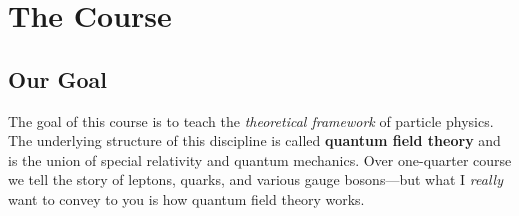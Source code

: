 \documentclass[12pt, oneside]{report}    %
\let\oldsection\section
\def\section{%
  \setcounter{sidenote}{1}%
  \oldsection
}
\begin{document}
\newpage

\small
\setcounter{tocdepth}{2}
\tableofcontents
\normalsize
\clearpage
\restoregeometry        %








% 
% 
% 
% 
% 


\chapter{The Course}

\section{Our Goal}

The goal of this course is to teach the \emph{theoretical framework} of particle physics. The underlying structure of this discipline is called \textbf{quantum field theory} and is the union of special relativity and quantum mechanics. Over one-quarter course we tell the story of leptons, quarks, and various gauge bosons---but what I \emph{really} want to convey to you is how quantum field theory works. 
\end{document}

